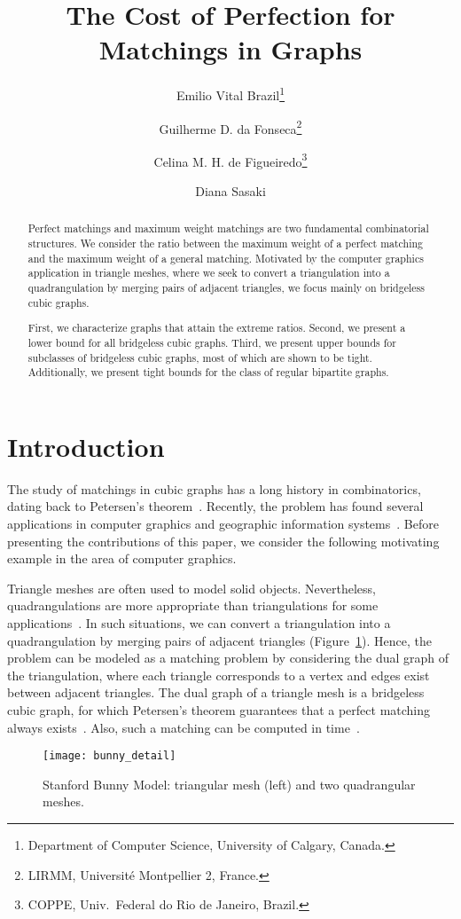 \documentclass{article}
\title{The Cost of Perfection for Matchings in Graphs}
\author{
Emilio Vital Brazil\thanks{Department of Computer Science, University of Calgary, Canada.}
\and
Guilherme D. da Fonseca\thanks{LIRMM, Universit\'e Montpellier 2, France.}
\and
Celina M. H. de Figueiredo\thanks{COPPE, Univ.~Federal do Rio de Janeiro, Brazil.}
\and
Diana Sasaki\footnotemark[3]
}
\begin{document}
\maketitle

\begin{abstract}
Perfect matchings and maximum weight matchings are two fundamental combinatorial structures. 
We consider the ratio between the maximum weight of a perfect matching and the maximum weight of a general matching. 
Motivated by the computer graphics application in triangle meshes, where we seek to convert a triangulation into a quadrangulation by merging pairs of adjacent triangles, we focus mainly on bridgeless cubic graphs.
	
First, we characterize graphs that attain the extreme ratios. 
Second, we present a lower bound for all bridgeless cubic graphs.
Third, we present upper bounds for subclasses of bridgeless cubic graphs, most of which are shown to be tight.
Additionally, we present tight bounds for the class of regular bipartite graphs.
\end{abstract}


\section{Introduction}
\label{Introduction}
The study of matchings in cubic graphs has a long history in combinatorics, dating back to Petersen's theorem~\cite{konig}. 
Recently, the problem has found several applications in computer graphics and geographic information systems~\cite{biedl01,gopi04,remacle11,daniels11}.
Before presenting the contributions of this paper, we consider the following motivating example in the area of computer graphics.

Triangle meshes are often used to model solid objects. 
Nevertheless, quadrangulations are more appropriate than triangulations for some applications~\cite{daniels11, tri2quad}. 
In such situations, we can convert a triangulation into a quadrangulation by merging pairs of adjacent triangles (Figure~\ref{fig:bunny}). 
Hence, the problem can be modeled as a matching problem by considering the dual graph of the triangulation, where each triangle corresponds to a vertex and edges exist between adjacent triangles. 
The dual graph of a triangle mesh is a bridgeless cubic graph, for which Petersen's theorem guarantees that a perfect matching always exists~\cite{biedl01,bm}. 
Also, such a matching can be computed in  time~\cite{diks10}.

\begin{figure}[t]
\centering
\texttt{[image: bunny\_detail]}
\caption{Stanford Bunny Model: triangular mesh (left) and two quadrangular meshes.}
\label{fig:bunny}
\end{figure}
\end{document}
